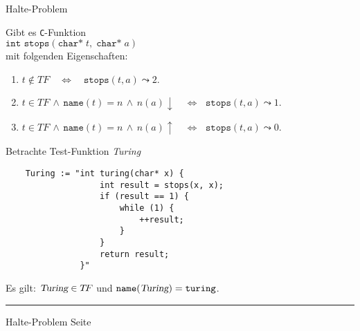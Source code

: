 \documentclass{slides}
\newcounter{mypage}
\begin{document}
\begin{slide}{}
\normalsize

\begin{center}
Halte-Problem
\end{center}
\vspace*{0.5cm}

\footnotesize
Gibt es \texttt{C}-Funktion \\[0.3cm]
\hspace*{1.3cm} 
$\texttt{int stops}(\texttt{char*}\;t,\;\texttt{char*}\;a)$ \\[0.3cm]
mit folgenden Eigenschaften:
\begin{enumerate}
\item $t \not\in T\!F \quad\Leftrightarrow\quad \mathtt{stops}(t, a) \leadsto 2$.
\item $t \in T\!F \,\wedge\, \mathtt{name}(t) = n \,\wedge\, n(a)\downarrow  \quad\Leftrightarrow\;$ 
      $\mathtt{stops}(t, a) \leadsto 1$.
\item $t \in T\!F \,\wedge\, \mathtt{name}(t) = n \,\wedge\, n(a)\uparrow \quad\Leftrightarrow\;$ 
      $\mathtt{stops}(t, a) \leadsto 0$.
\end{enumerate}


\footnotesize
Betrachte Test-Funktion \textsl{Turing}
\begin{verbatim}
    Turing := "int turing(char* x) {
                   int result = stops(x, x);
                   if (result == 1) {
                       while (1) {
                           ++result;
                       }
                   }
                   return result;
               }"
\end{verbatim}
Es gilt: $\textsl{Turing}\in T\!F$ und $\mathtt{name}(\textsl{Turing}) = \mathtt{turing}$.

\vspace*{\fill}
\tiny \addtocounter{mypage}{1}
\rule{17cm}{1mm}
Halte-Problem  \hspace*{\fill} Seite 
\end{slide}

\end{document}

